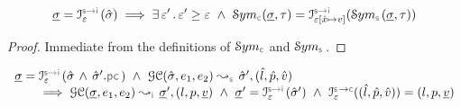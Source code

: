 \begin{lemma}
$$
\istate = \interpret{\symbinst}{\senv}(\sstate) 
   \implies \exists \, \senv' \, . \,  \senv' \fextends \senv \ \wedge \ \absmakesymbolicrule{\concrete}{\istate, \jtype} 
              = \interpret{\symbinst}{\senv[\svar \mapsto \val]}(\absmakesymbolicrule{\symbolic}{\istate, \jtype})
$$
 \end{lemma}
 \begin{proof}
 Immediate from the definitions of $\absmakesymbolic_{\concrete}$ and $\absmakesymbolic_{\symbolic}$.  
 \end{proof}


\begin{lemma}
$$
\begin{array}{l}
\istate = \interpret{\symbinst}{\senv}(\sstate \, \wedge \, \sstate'.\pcsel)  \ \wedge \ 
\absgetcellrule{\symbolic}{\sstate, \jsilexpr_1, \jsilexpr_2}{\sstate', (\sloc, \sexprp, \sexprv)} \\ \quad \quad
  \implies \absgetcellrule{\instrumented}{\istate, \jsilexpr_1, \jsilexpr_2}{\istate', (\loc, p, \ival)} 
     \ \wedge \ \istate' = \interpret{\symbinst}{\senv}(\sstate')
     \ \wedge \ \interpret{\symbconc}{\senv}((\sloc, \sexprp, \sexprv)) = (\loc, p, \ival)
\end{array}
$$
 \end{lemma}
